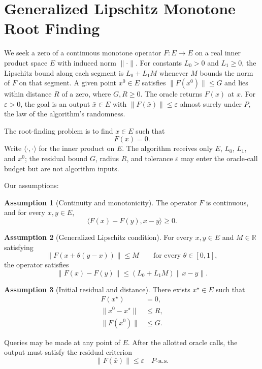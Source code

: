 \documentclass[10pt]{article}
\theoremstyle{definition}
\newtheorem{assumption}{Assumption}
\begin{document}
\section*{Generalized Lipschitz Monotone Root Finding}
We seek a zero of a continuous monotone operator $F:E\to E$ on a real inner product space $E$ with induced norm $\|\cdot\|$. For constants $L_0>0$ and $L_1\geq0$, the Lipschitz bound along each segment is $L_0+L_1M$ whenever $M$ bounds the norm of $F$ on that segment. A given point $x^0\in E$ satisfies $\|F(x^0)\|\leq G$ and lies within distance $R$ of a zero, where $G,R\geq0$. The oracle returns $F(x)$ at $x$. For $\varepsilon>0$, the goal is an output $\bar{x}\in E$ with $\|F(\bar{x})\|\leq\varepsilon$ almost surely under $P$, the law of the algorithm's randomness.

The root-finding problem is to find $x\in E$ such that
\[
F(x)=0.
\]
Write $\langle\cdot,\cdot\rangle$ for the inner product on $E$. The algorithm receives only $E$, $L_0$, $L_1$, and $x^0$; the residual bound $G$, radius $R$, and tolerance $\varepsilon$ may enter the oracle-call budget but are not algorithm inputs.

Our assumptions:
\begin{assumption}[Continuity and monotonicity]
The operator $F$ is continuous, and for every $x,y\in E$,
\[
\langle F(x)-F(y),x-y\rangle\geq0.
\]
\end{assumption}

\begin{assumption}[Generalized Lipschitz condition]
For every $x,y\in E$ and $M\in\mathbb{R}$ satisfying
\[
\|F(x+\theta(y-x))\|\leq M
\qquad\text{for every }\theta\in[0,1],
\]
the operator satisfies
\[
\|F(x)-F(y)\|\leq (L_0+L_1M)\|x-y\|.
\]
\end{assumption}

\begin{assumption}[Initial residual and distance]
There exists $x^\star\in E$ such that
\[
\begin{aligned}
F(x^\star)&=0,\\
\|x^0-x^\star\|&\leq R,\\
\|F(x^0)\|&\leq G.
\end{aligned}
\]
\end{assumption}

Queries may be made at any point of $E$. After the allotted oracle calls, the output must satisfy the residual criterion
\[
\|F(\bar{x})\|\leq\varepsilon
\quad P\text{-a.s.}
\]
\end{document}
